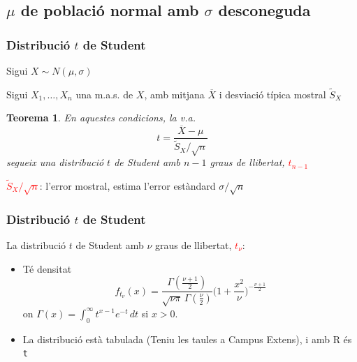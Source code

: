 \documentclass[12pt,t]{beamer}
\newcommand{\red}[1]{\textcolor{red}{#1}}
\renewcommand{\emph}[1]{{\color{red}#1}}
\theoremstyle{plain}
\newtheorem{teorema}{Teorema}
\theoremstyle{definition}
\begin{document}
\subsection{$\mu$ de població normal amb $\sigma$ desconeguda}

\begin{frame}
\frametitle{Distribució $t$ de Student}


Sigui $X\sim N(\mu,\sigma)$
\medskip

Sigui $X_1,\ldots,X_n$ una m.a.s. de $X$, amb mitjana $\overline{X}$ i desviació típica mostral $\widetilde{S}_{X}$
\medskip

\begin{teorema}
En aquestes condicions, la v.a.
$$
t=\frac{\overline{X}-\mu}{\widetilde{S}_{X}/\sqrt{n}}
$$
segueix una distribució \emph{$t$ de Student} amb $n-1$ graus de llibertat, \red{$t_{n-1}$}
\end{teorema}
\medskip

\red{$\widetilde{S}_{X}/\sqrt{n}$}: l'\emph{error mostral}, estima l'error estàndard $\sigma/\sqrt{n}$


\end{frame}



\begin{frame}
\frametitle{Distribució $t$ de Student}


La distribució $t$ de Student amb $\nu$ graus de llibertat, \red{$t_{\nu}$}:
\medskip

\begin{itemize}
\item  Té densitat
$$
f_{t_\nu}(x) = \frac{\Gamma(\frac{\nu+1}{2})} {\sqrt{\nu\pi}\,\Gamma(\frac{\nu}{2})} \Big(1+\frac{x^2}{\nu} \Big)^{-\frac{\nu+1}{2}}
$$
on $\Gamma(x)=\int_{0}^{\infty} t^{x-1}e^{-t}\, dt$ si $x> 0$. 
\bigskip

\item La distribució està tabulada (\emph{Teniu les taules a Campus Extens}), i amb R és \texttt{t}

\end{itemize}

\end{frame}
\end{document}
